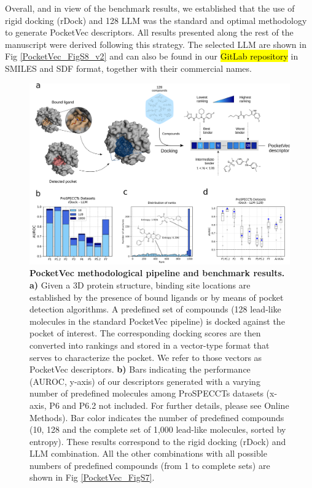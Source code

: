 Overall, and in view of the benchmark results, we established that the use of rigid docking (rDock) and 128 LLM was the standard and optimal methodology to generate PocketVec descriptors. All results presented along the rest of the manuscript were derived following this strategy. The selected LLM are shown in Fig \ref{PocketVec_FigS8_v2} and can also be found in our \hl{GitLab repository} in SMILES and SDF format, together with their commercial names. 



\begin{figure}[htbp]
  \centering
  \includegraphics[width=\linewidth]{figures/PocketVec/Main/Fig1.png} 
  \caption{
    \textbf{PocketVec methodological pipeline and benchmark results.} 
    \textbf{a)} Given a 3D protein structure, binding site locations are established by the presence of bound ligands or by means of pocket detection algorithms. A predefined set of compounds (128 lead-like molecules in the standard PocketVec pipeline) is docked against the pocket of interest. The corresponding docking scores are then converted into rankings and stored in a vector-type format that serves to characterize the pocket. We refer to those vectors as PocketVec descriptors.
    \textbf{b)} Bars indicating the performance (AUROC, y-axis) of our descriptors generated with a varying number of predefined molecules among ProSPECCTs datasets (x-axis, P6 and P6.2 not included. For further details, please see Online Methods). Bar color indicates the number of predefined compounds (10, 128 and the complete set of 1,000 lead-like molecules, sorted by entropy). These results correspond to the rigid docking (rDock) and LLM combination. All the other combinations with all possible numbers of predefined compounds (from 1 to complete sets) are shown in Fig \ref{PocketVec_FigS7}.
}
\end{figure}
